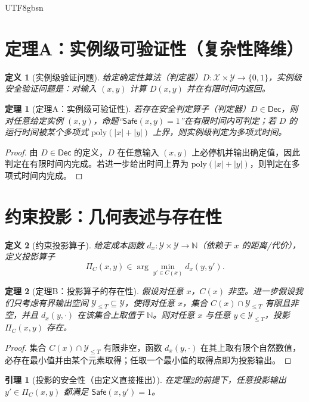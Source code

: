 \documentclass[letterpaper,twocolumn,10pt]{article}
\newtheorem{theorem}{定理}
\newtheorem{definition}{定义}
\newtheorem{lemma}{引理}
\newcommand{\Safe}{\mathsf{Safe}}
\newcommand{\Dec}{\mathsf{Dec}}
\newcommand{\Proj}{\Pi}
\newcommand{\Out}{\mathcal{Y}}
\newcommand{\In}{\mathcal{X}}
\newcommand{\Nat}{\mathbb{N}}
\newcommand{\poly}{\mathrm{poly}}
\begin{document}
\begin{CJK}{UTF8}{gbsn}
\section{定理A：实例级可验证性（复杂性降维）}
\begin{definition}[实例级验证问题]\label{def:instance-problem}
给定确定性算法（判定器）$D:\In\times \Out\to\{0,1\}$，实例级安全验证问题是：对输入 $(x,y)$ 计算 $D(x,y)$ 并在有限时间内返回。
\end{definition}

\begin{theorem}[定理A：实例级可验证性]\label{thm:A}
若存在安全判定算子（判定器）$D\in\Dec$，则对任意给定实例 $(x,y)$，命题“$\Safe(x,y)=1$”在有限时间内可判定；若 $D$ 的运行时间被某个多项式 $\poly(|x|+|y|)$ 上界，则实例级判定为多项式时间。
\end{theorem}

\begin{proof}
由 $D\in\Dec$ 的定义，$D$ 在任意输入 $(x,y)$ 上必停机并输出确定值，因此判定在有限时间内完成。若进一步给出时间上界为 $\poly(|x|+|y|)$，则判定在多项式时间内完成。
\end{proof}

\section{约束投影：几何表述与存在性}
\begin{definition}[约束投影算子]\label{def:projection}
给定成本函数 $d_x:\Out\times\Out\to \Nat$（依赖于 $x$ 的距离/代价），定义投影算子
\[
\Proj_C(x,y)\in\arg\min_{y'\in C(x)} d_x(y,y').
\]
\end{definition}

\begin{theorem}[定理B：投影算子的存在性]\label{thm:B}
假设对任意 $x$，$C(x)$ 非空。进一步假设我们只考虑有界输出空间 $\Out_{\le T}\subseteq\Out$，使得对任意 $x$，集合 $C(x)\cap \Out_{\le T}$ 有限且非空，并且 $d_x(y,\cdot)$ 在该集合上取值于 $\Nat$。则对任意 $x$ 与任意 $y\in \Out_{\le T}$，投影 $\Proj_C(x,y)$ 存在。
\end{theorem}

\begin{proof}
集合 $C(x)\cap\Out_{\le T}$ 有限非空，函数 $d_x(y,\cdot)$ 在其上取有限个自然数值，必存在最小值并由某个元素取得；任取一个最小值的取得点即为投影输出。
\end{proof}

\begin{lemma}[投影的安全性（由定义直接推出）]\label{lem:proj-sound}
在定理\ref{thm:B}的前提下，任意投影输出 $y'\in \Proj_C(x,y)$ 都满足 $\Safe(x,y')=1$。
\end{lemma}


\end{CJK}
\end{document}
